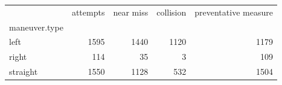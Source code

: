 \begin{tabular}{lrrrr}
\toprule
 & attempts & near miss & collision & preventative measure \\
maneuver.type &  &  &  &  \\
\midrule
left & 1595 & 1440 & 1120 & 1179 \\
right & 114 & 35 & 3 & 109 \\
straight & 1550 & 1128 & 532 & 1504 \\
\bottomrule
\end{tabular}
